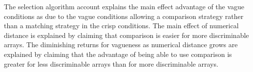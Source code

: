 \documentclass[doc,apacite]{apa6}
\begin{document}
The selection algorithm account explains the main effect advantage of the vague conditions as due to the vague conditions allowing a comparison strategy rather than a matching strategy in the crisp conditions. The main effect of numerical distance is explained by claiming that comparison is easier for more discriminable arrays. The diminishing returns for vagueness as numerical distance grows are explained by claiming that the advantage of being able to use comparison is greater for less discriminable arrays than for more discriminable arrays.


\end{document}

